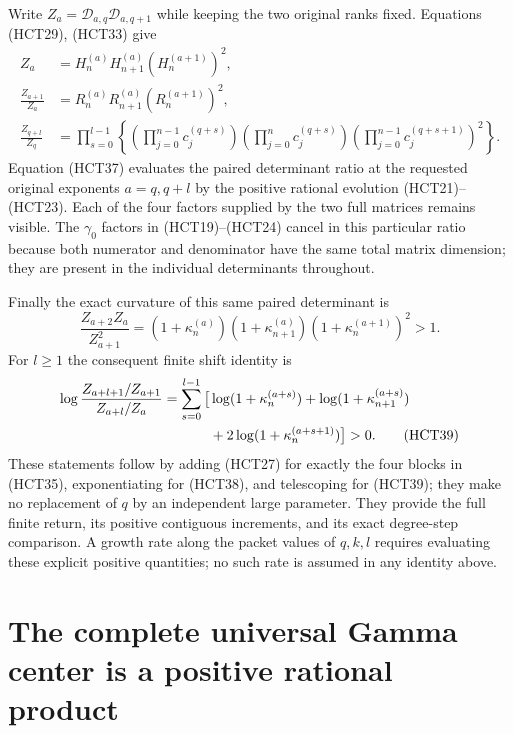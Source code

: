 \documentclass[11pt,a4paper]{article}
\begin{document}
Write $Z_a=\mathcal D_{a,q}\mathcal D_{a,q+1}$ while keeping
the two original ranks fixed. Equations (HCT29), (HCT33) give
\begin{align}
 Z_a&=H_n^{(a)}H_{n+1}^{(a)}(H_n^{(a+1)})^2,\tag{HCT35}\\
 \frac{Z_{a+1}}{Z_a}
 &=R_n^{(a)}R_{n+1}^{(a)}(R_n^{(a+1)})^2,\tag{HCT36}\\
 \frac{Z_{q+l}}{Z_q}
 &=\prod_{s=0}^{l-1}
 \left\{
 \left(\prod_{j=0}^{n-1}c_j^{(q+s)}\right)
 \left(\prod_{j=0}^{n}c_j^{(q+s)}\right)
 \left(\prod_{j=0}^{n-1}c_j^{(q+s+1)}\right)^2
 \right\}.\tag{HCT37}
\end{align}
Equation (HCT37) evaluates the paired determinant ratio at the
requested original exponents $a=q,q+l$ by the positive rational
evolution (HCT21)--(HCT23). Each of the four factors supplied by
the two full matrices remains visible. The $\gamma_0$ factors
in (HCT19)--(HCT24) cancel in this particular ratio because both
numerator and denominator have the same total matrix dimension;
they are present in the individual determinants throughout.

Finally the exact curvature of this same paired determinant is
\begin{equation}\tag{HCT38}
 \frac{Z_{a+2}Z_a}{Z_{a+1}^2}
 =(1+\kappa_n^{(a)})(1+\kappa_{n+1}^{(a)})
  (1+\kappa_n^{(a+1)})^2>1.
\end{equation}
For $l\geq1$ the consequent finite shift identity is
\begin{align}
 \log\frac{Z_{a+l+1}/Z_{a+1}}{Z_{a+l}/Z_a}
 =\sum_{s=0}^{l-1}\big[&\log(1+\kappa_n^{(a+s)})
 +\log(1+\kappa_{n+1}^{(a+s)})\notag\\*
 &+2\log(1+\kappa_n^{(a+s+1)})\big]>0.\tag{HCT39}
\end{align}
These statements follow by adding (HCT27) for exactly the four
blocks in (HCT35), exponentiating for (HCT38), and telescoping
for (HCT39); they make no replacement of $q$ by an
independent large parameter. They provide the full finite return,
its positive contiguous increments, and its exact degree-step
comparison. A growth rate along the packet values of $q,k,l$
requires evaluating these explicit positive quantities; no such
rate is assumed in any identity above.



\section{The complete universal Gamma center is a positive rational product}
\end{document}
